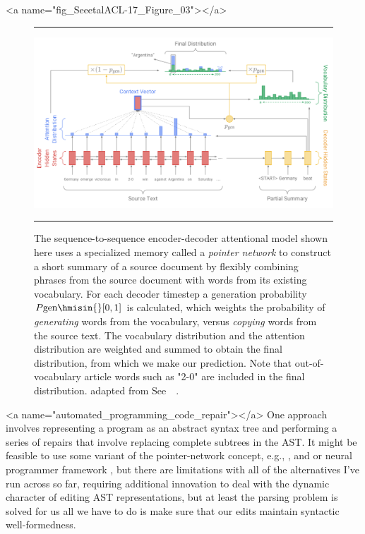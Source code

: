 
\setcounter{figure}{1}


\rawhtml
<a name="fig_SeeetalACL-17_Figure_03"></a>
\endrawhtml
\begin{figure}
%
  \hrule{}
%
  \begin{center}
    \includegraphics[width=10.0in]{./figures/SeeetalACL-17_Figure_03.png}
  \end{center}
%
        \caption{The sequence-to-sequence encoder-decoder attentional model shown here uses a specialized memory called a {\it{pointer network}} to construct a short summary of a source document by flexibly combining phrases from the source document with words from its existing vocabulary. For each decoder timestep a generation probability $P\mbox{\rm{gen}} \hmisin{} [0, 1]$ is calculated, which weights the probability of {\it{generating}} words from the vocabulary, versus {\it{copying}} words from the source text. The vocabulary distribution and the attention distribution are weighted and summed to obtain the final distribution, from which we make our prediction. Note that out-of-vocabulary article words such as "2-0" are included in the final distribution. \emdash{} adapted from See~\etal{}~\cite{SeeetalACL-17}.}
%
  \hrule{}
%
\end{figure}


\rawhtml
<a name="automated_programming_code_repair"></a>
\endrawhtml
One approach involves representing a program as an abstract syntax tree and performing a series of repairs that involve replacing complete subtrees in the AST. It might be feasible to use some variant of the pointer-network concept, e.g., {\cite{BhoopchandetalICLR-17}}, {\cite{SeeetalACL-17}} and  {\cite{WangandJiangICLR-17}} or neural programmer framework {\cite{NeelakantanetalICLR-17}}, but there are limitations with all of the alternatives I've run across so far, requiring additional innovation to deal with the dynamic character of editing AST representations, but at least the parsing problem is solved for us \emdash{} all we have to do is make sure that our edits maintain syntactic well-formedness.

